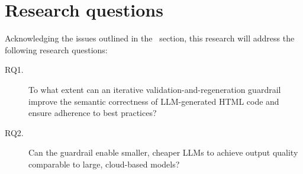 \section{Research questions}
\label{sec:research-questions}

Acknowledging the issues outlined in the~ section, this research will address the following research questions:

\begin{description}
	\item[RQ1.] To what extent can an iterative validation-and-regeneration guardrail improve the semantic correctness of LLM-generated HTML code and ensure adherence to best practices?
	\item[RQ2.] Can the guardrail enable smaller, cheaper LLMs to achieve output quality comparable to large, cloud-based models?
\end{description}

